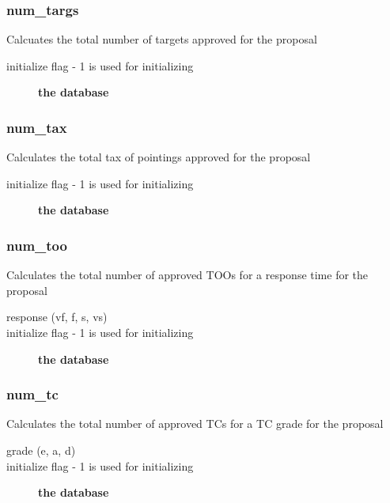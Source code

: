 \documentclass{article}
\begin{document}
\subsubsection*{num\_targs\label{Proposal_num_targs}}


Calcuates the total number of targets approved for the proposal

\begin{description}

\item[{initialize flag - 1 is used for initializing}] \textbf{the database}\end{description}
\subsubsection*{num\_tax\label{Proposal_num_tax}}


Calculates the total tax of pointings approved for the proposal

\begin{description}

\item[{initialize flag - 1 is used for initializing}] \textbf{the database}\end{description}
\subsubsection*{num\_too\label{Proposal_num_too}}


Calculates the total number of approved TOOs for a response time for the 
proposal

\begin{description}

\item[{response (vf, f, s, vs)}] \mbox{}
\item[{initialize flag - 1 is used for initializing}] \textbf{the database}\end{description}
\subsubsection*{num\_tc\label{Proposal_num_tc}}


Calculates the total number of approved TCs for a TC grade for the proposal

\begin{description}

\item[{grade (e, a, d)}] \mbox{}
\item[{initialize flag - 1 is used for initializing}] \textbf{the database}\end{description}
\end{document}
